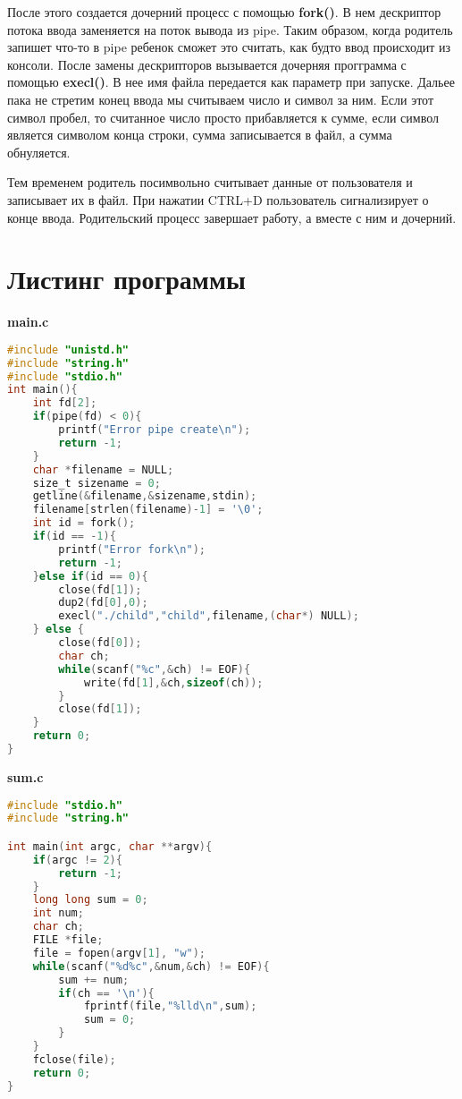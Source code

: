 \documentclass[pdf, unicode, 12pt, a4paper,oneside,fleqn]{article}
\begin{document}
После этого создается дочерний процесс с помощью \textbf{fork()}. В нем дескриптор потока ввода заменяется на поток вывода из pipe.
Таким образом, когда родитель запишет что-то в pipe ребенок сможет это считать, как будто ввод происходит из консоли. После замены 
дескрипторов вызывается дочерняя прогграмма с помощью \textbf{execl()}. В нее имя файла передается как параметр при запуске. 
Дальее пака не стретим конец ввода мы считываем число и символ за ним. Если этот символ пробел, то считанное число просто прибавляется к сумме, если 
символ является символом конца строки, сумма записывается в файл, а сумма обнуляется.

Тем временем родитель посимвольно считывает данные от пользователя и записывает их в файл.
При нажатии CTRL+D пользователь сигнализирует о конце ввода. Родительский процесс завершает работу,
а вместе с ним и дочерний.

\section{Листинг программы}

{\large\textbf{main.c}}

\begin{lstlisting}[language=C]
#include "unistd.h"
#include "string.h"
#include "stdio.h"
int main(){
    int fd[2];
    if(pipe(fd) < 0){
        printf("Error pipe create\n");
        return -1;
    }
    char *filename = NULL;
    size_t sizename = 0;
    getline(&filename,&sizename,stdin);
    filename[strlen(filename)-1] = '\0';
    int id = fork();
    if(id == -1){
        printf("Error fork\n");
        return -1;
    }else if(id == 0){
        close(fd[1]);
        dup2(fd[0],0);
        execl("./child","child",filename,(char*) NULL);
    } else {
        close(fd[0]);
        char ch;
        while(scanf("%c",&ch) != EOF){
            write(fd[1],&ch,sizeof(ch));  
        }
        close(fd[1]);
    }
    return 0;
}
\end{lstlisting}

{\large\textbf{sum.c}}

\begin{lstlisting}[language=C]
#include "stdio.h"
#include "string.h"

int main(int argc, char **argv){
    if(argc != 2){
        return -1;
    }
    long long sum = 0;
    int num;
    char ch;
    FILE *file;
    file = fopen(argv[1], "w");
    while(scanf("%d%c",&num,&ch) != EOF){
        sum += num;
        if(ch == '\n'){
            fprintf(file,"%lld\n",sum);
            sum = 0;
        }
    }
    fclose(file);
    return 0;
}
\end{lstlisting}
\end{document}
